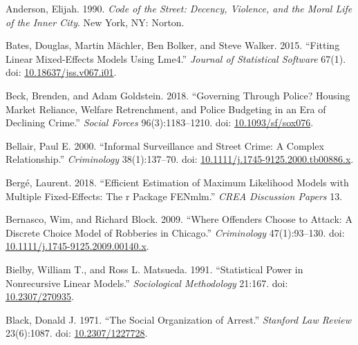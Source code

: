 \documentclass [11pt, proquest] {uwthesis}[2015/03/03]
\newlength{\cslhangindent}
\newenvironment{CSLReferences}[2]%
{\setlength{\parindent}{0pt}%
\everypar{\setlength{\hangindent}{\cslhangindent}}\ignorespaces}%
{\par}
\begin{document}
\hypertarget{refs}{}
\begin{CSLReferences}{1}{0}
\leavevmode\hypertarget{ref-andersonCodeStreetDecency1990}{}%
Anderson, Elijah. 1990. \emph{Code of the Street: Decency, Violence, and the Moral Life of the Inner City}. {New York, NY}: {Norton}.

\leavevmode\hypertarget{ref-batesFittingLinearMixedEffects2015}{}%
Bates, Douglas, Martin Mächler, Ben Bolker, and Steve Walker. 2015. {``Fitting {Linear Mixed}-{Effects Models Using} Lme4.''} \emph{Journal of Statistical Software} 67(1). doi: \href{https://doi.org/10.18637/jss.v067.i01}{10.18637/jss.v067.i01}.

\leavevmode\hypertarget{ref-beckGoverningPoliceHousing2018}{}%
Beck, Brenden, and Adam Goldstein. 2018. {``Governing {Through Police}? {Housing Market Reliance}, {Welfare Retrenchment}, and {Police Budgeting} in an {Era} of {Declining Crime}.''} \emph{Social Forces} 96(3):1183--1210. doi: \href{https://doi.org/10.1093/sf/sox076}{10.1093/sf/sox076}.

\leavevmode\hypertarget{ref-bellairInformalSurveillanceStreet2000}{}%
Bellair, Paul E. 2000. {``Informal {Surveillance} and {Street Crime}: {A Complex Relationship}.''} \emph{Criminology} 38(1):137--70. doi: \href{https://doi.org/10.1111/j.1745-9125.2000.tb00886.x}{10.1111/j.1745-9125.2000.tb00886.x}.

\leavevmode\hypertarget{ref-bergeEfficientEstimationMaximum2018}{}%
Bergé, Laurent. 2018. {``Efficient Estimation of Maximum Likelihood Models with Multiple Fixed-Effects: The r Package FENmlm.''} \emph{CREA Discussion Papers} 13.

\leavevmode\hypertarget{ref-bernascoWhereOffendersChoose2009}{}%
Bernasco, Wim, and Richard Block. 2009. {``Where {Offenders Choose} to {Attack}: {A Discrete Choice Model} of {Robberies} in {Chicago}.''} \emph{Criminology} 47(1):93--130. doi: \href{https://doi.org/10.1111/j.1745-9125.2009.00140.x}{10.1111/j.1745-9125.2009.00140.x}.

\leavevmode\hypertarget{ref-bielbyStatisticalPowerNonrecursive1991}{}%
Bielby, William T., and Ross L. Matsueda. 1991. {``Statistical {Power} in {Nonrecursive Linear Models}.''} \emph{Sociological Methodology} 21:167. doi: \href{https://doi.org/10.2307/270935}{10.2307/270935}.

\leavevmode\hypertarget{ref-blackSocialOrganizationArrest1971}{}%
Black, Donald J. 1971. {``The {Social Organization} of {Arrest}.''} \emph{Stanford Law Review} 23(6):1087. doi: \href{https://doi.org/10.2307/1227728}{10.2307/1227728}.


\end{CSLReferences}
\end{document}
